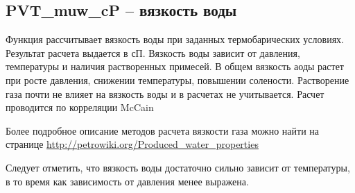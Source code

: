 \newcommand{\MugDataFile}{data/Mug_P_data.txt}

\subsection{PVT\_muw\_cP – вязкость воды}

Функция рассчитывает вязкость воды при заданных термобарических условиях. Результат расчета выдается в сП. 
Вязкость воды зависит от давления, температуры и наличия растворенных примесей. В общем вязкость аоды растет при росте давления, снижении температуры, повышении солености. 
Растворение газа почти не влияет на вязкость воды и в расчетах не учитывается. 
Расчет проводится по корреляции McCain \cite{McCain_1991}

Более подробное описание методов расчета вязкости газа можно найти на странице  \href{http://petrowiki.org/Produced_water_properties}{http://petrowiki.org/Produced\_water\_properties}




Следует отметить, что вязкость воды достаточно сильно зависит от температуры, в то время как зависимость от давления менее выражена.

